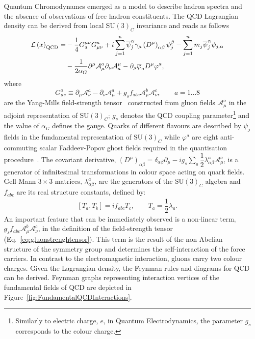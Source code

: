 Quantum Chromodynamcs emerged as a model to describe hadron spectra and the absence of observations of free hadron constituents. The QCD Lagrangian density can be derived from local $\mathrm{SU}\left(3\right)_{C}$ invariance and reads as follows
\begin{align}
 \mathcal{L}\left( x\right)_{\mathrm{QCD}}  = & -\dfrac{1}{4}G_a^{\mu\nu}G_{\mu\nu}^a + i\sum_{j=1}^n{\overline{\psi}^{\alpha}_j \gamma_\mu \left( D^\mu \right)_{\alpha\beta} \psi_j^\beta } - \sum_{j=1}^n{m_j\overline{\psi}^{\alpha}_j\psi_{j,\alpha}} \notag\\
					      & - \dfrac{1}{2\alpha_G} \partial^\mu \mathcal{A}^a_\mu \partial_\mu \mathcal{A}_a^\mu - \partial_\mu \overline{\varphi}_a D^\mu \varphi^a,
								\label{eq:qcdlagrangian}
\end{align}
where 
\begin{equation}
G_{\mu\nu}^a \equiv \partial_\mu \mathcal{A}^a_\nu - \partial_\nu \mathcal{A}^a_\mu + g_sf_{abc}\mathcal{A}^b_\mu \mathcal{A}^c_\nu , \qquad a=1 \ldots 8
\label{eq:gluonstrenghtensor}
\end{equation}
are the Yang-Mills field-strength tensor~\cite{Yang:1954ek} constructed from gluon fields $\mathcal{A}^a_\mu$ in the adjoint representation of $\mathrm{SU}\left(3\right)_C$; $g_s$ denotes the QCD coupling parameter\footnote{Similarly to electric charge, $e$, in Quantum Electrodynamics, the parameter $g_s$ corresponds to the colour charge.} and the value of $\alpha_G$ defines the gauge. Quarks of different flavours are described by $\psi_j$ fields in the fundamental representation of $\mathrm{SU}\left(3\right)_C$ while $\varphi^a$ are eight anti-commuting scalar Faddeev-Popov ghost fields required in the quantisation procedure~\cite{Faddeev:1967fc, DeWitt:1964yg}. The covariant derivative, $\left( D^\mu \right)_{\alpha\beta} = \delta_{\alpha\beta}\partial_\mu - ig_s\sum_a{\dfrac{1}{2}\lambda^a_{\alpha\beta}\mathcal{A}^a_\mu}$, is a generator of infinitesimal transformations in colour space acting on quark fields. Gell-Mann $3\times 3$ matrices, $\lambda^a_{\alpha\beta}$, are the generators of the $\mathrm{SU}\left(3\right)_C$ algebra and $f_{abc}$ are its real structure constants, defined by:
\begin{align}
 \left[T_a,T_b\right] = if_{abc}T_c,\qquad T_a = \dfrac{1}{2}\lambda_a.
\end{align}
An important feature that can be immediately observed is a non-linear term, $g_sf_{abc}\mathcal{A}^b_\mu \mathcal{A}^c_\nu$, in the definition of the field-strength tensor (Eq.~\eqref{eq:gluonstrenghtensor}). This term is the result of the non-Abelian structure of the symmetry group and determines the self-interaction of the force carriers. In contrast to the electromagnetic interaction, gluons carry two colour charges. Given the Lagrangian density, the Feynman rules and diagrams for QCD can be derived.  Feynman graphs representing interaction vertices of the fundamental fields of QCD are depicted in Figure~\ref{fig:FundamentalQCDInteractions}.

